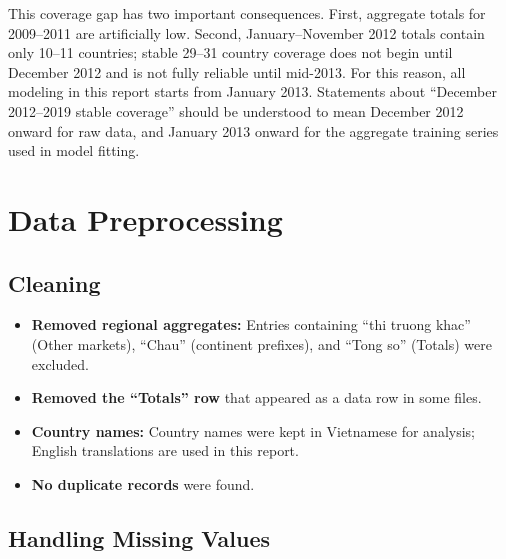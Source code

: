 \documentclass[
]{article}
\providecommand{\tightlist}{%
  \setlength{\itemsep}{0pt}\setlength{\parskip}{0pt}}
\begin{document}
This coverage gap has two important consequences. First, aggregate
totals for 2009--2011 are artificially low. Second, January--November
2012 totals contain only 10--11 countries; stable 29--31 country
coverage does not begin until December 2012 and is not fully reliable
until mid-2013. For this reason, all modeling in this report starts from
January 2013. Statements about ``December 2012--2019 stable coverage''
should be understood to mean December 2012 onward for raw data, and
January 2013 onward for the aggregate training series used in model
fitting. \newpage

\section{Data Preprocessing}\label{data-preprocessing}

\subsection{Cleaning}\label{cleaning}

\begin{itemize}
\tightlist
\item
  \textbf{Removed regional aggregates:} Entries containing ``thi truong
  khac'' (Other markets), ``Chau'' (continent prefixes), and ``Tong so''
  (Totals) were excluded.
\item
  \textbf{Removed the ``Totals'' row} that appeared as a data row in
  some files.
\item
  \textbf{Country names:} Country names were kept in Vietnamese for
  analysis; English translations are used in this report.
\item
  \textbf{No duplicate records} were found.
\end{itemize}

\subsection{Handling Missing Values}\label{handling-missing-values}
\end{document}
